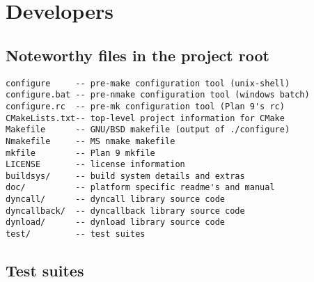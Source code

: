 %
%
%
%

\newpage
\section{Developers}

\subsection{Noteworthy files in the project root}
\begin{verbatim}
configure     -- pre-make configuration tool (unix-shell)
configure.bat -- pre-nmake configuration tool (windows batch)
configure.rc  -- pre-mk configuration tool (Plan 9's rc)
CMakeLists.txt-- top-level project information for CMake
Makefile      -- GNU/BSD makefile (output of ./configure)
Nmakefile     -- MS nmake makefile
mkfile        -- Plan 9 mkfile
LICENSE       -- license information
buildsys/     -- build system details and extras
doc/          -- platform specific readme's and manual
dyncall/      -- dyncall library source code
dyncallback/  -- dyncallback library source code
dynload/      -- dynload library source code
test/         -- test suites
\end{verbatim}


\subsection{Test suites}


